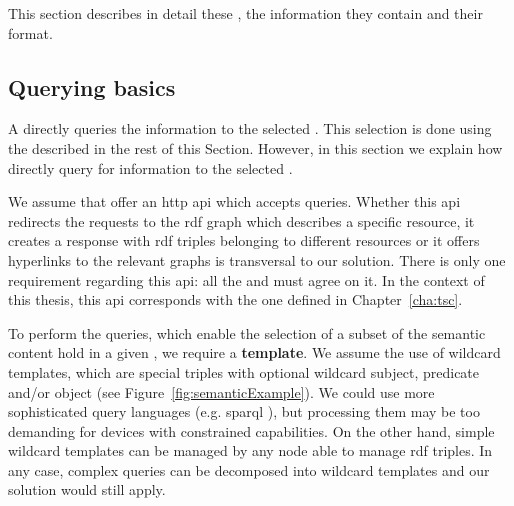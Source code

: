 This section describes in detail these \clues{}, the information they contain and their format.


\subsection{Querying basics} %


A \consumer{} directly queries the information to the selected \providers{}.
This selection is done using the \clues{} described in the rest of this Section.
However, in this section we explain how \consumers{} directly query for information to the selected \providers{}.

We assume that \providers{} offer an \ac{http} \ac{api} which accepts queries. %
Whether this \ac{api} redirects the requests to the \ac{rdf} graph which describes a specific resource,
it creates a response with \ac{rdf} triples belonging to different resources or
it offers hyperlinks to the relevant graphs is transversal to our solution.
There is only one requirement regarding this \ac{api}: all the \consumers{} and \providers{} must agree on it.
In the context of this thesis, this \ac{api} corresponds with the one defined in Chapter~\ref{cha:tsc}.

To perform the queries, which enable the selection of a subset of the semantic content hold in a given \Space{}, we require a \textbf{template}.
We assume the use of wildcard templates, which are special triples with optional wildcard subject, predicate and/or object (see Figure~\ref{fig:semanticExample}). %
We could use more sophisticated query languages (e.g. \ac{sparql} ),
but processing them may be too demanding for devices with constrained capabilities.
On the other hand, simple wildcard templates can be managed by any node able to manage \ac{rdf} triples.
In any case, complex queries can be decomposed into wildcard templates and our solution would still apply.





